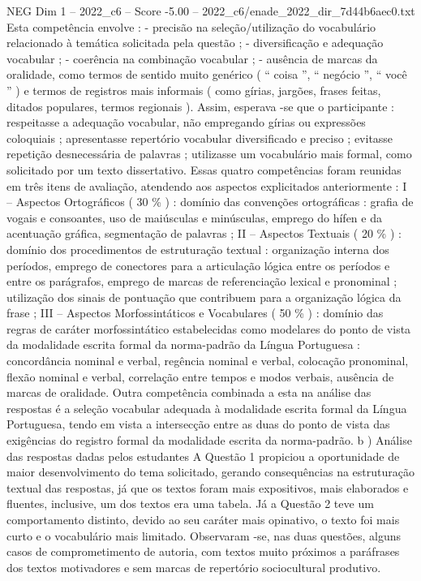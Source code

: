\begin{textsample}{NEG Dim 1 – 2022\_c6 – Score -5.00 – 2022\_c6/enade\_2022\_dir\_7d44b6aec0.txt}
Esta competência envolve : - precisão na seleção/utilização do vocabulário relacionado à temática solicitada pela questão ; - diversificação e adequação vocabular ; - coerência na combinação vocabular ; - ausência de marcas da oralidade, como termos de sentido muito genérico ( “ coisa ”, “ negócio ”, “ você ” ) e termos de registros mais informais ( como gírias, jargões, frases feitas, ditados populares, termos regionais ).
Assim, esperava -se que o participante : respeitasse a adequação vocabular, não empregando gírias ou expressões coloquiais ; apresentasse repertório vocabular diversificado e preciso ; evitasse repetição desnecessária de palavras ; utilizasse um vocabulário mais formal, como solicitado por um texto dissertativo.
Essas quatro competências foram reunidas em três itens de avaliação, atendendo aos aspectos explicitados anteriormente : I – Aspectos Ortográficos ( 30 \% ) : domínio das convenções ortográficas : grafia de vogais e consoantes, uso de maiúsculas e minúsculas, emprego do hífen e da acentuação gráfica, segmentação de palavras ; II – Aspectos Textuais ( 20 \% ) : domínio dos procedimentos de estruturação textual : organização interna dos períodos, emprego de conectores para a articulação lógica entre os períodos e entre os parágrafos, emprego de marcas de referenciação lexical e pronominal ; utilização dos sinais de pontuação que contribuem para a organização lógica da frase ; III – Aspectos Morfossintáticos e Vocabulares ( 50 \% ) : domínio das regras de caráter morfossintático estabelecidas como modelares do ponto de vista da modalidade escrita formal da norma-padrão da Língua Portuguesa : concordância nominal e verbal, regência nominal e verbal, colocação pronominal, flexão nominal e verbal, correlação entre tempos e modos verbais, ausência de marcas de oralidade.
Outra competência combinada a esta na análise das respostas é a seleção vocabular adequada à modalidade escrita formal da Língua Portuguesa, tendo em vista a intersecção entre as duas do ponto de vista das exigências do registro formal da modalidade escrita da norma-padrão. b ) Análise das respostas dadas pelos estudantes A Questão 1 propiciou a oportunidade de maior desenvolvimento do tema solicitado, gerando consequências na estruturação textual das respostas, já que os textos foram mais expositivos, mais elaborados e fluentes, inclusive, um dos textos era uma tabela.
Já a Questão 2 teve um comportamento distinto, devido ao seu caráter mais opinativo, o texto foi mais curto e o vocabulário mais limitado.
Observaram -se, nas duas questões, alguns casos de comprometimento de autoria, com textos muito próximos a paráfrases dos textos motivadores e sem marcas de repertório sociocultural produtivo.

\end{textsample}
